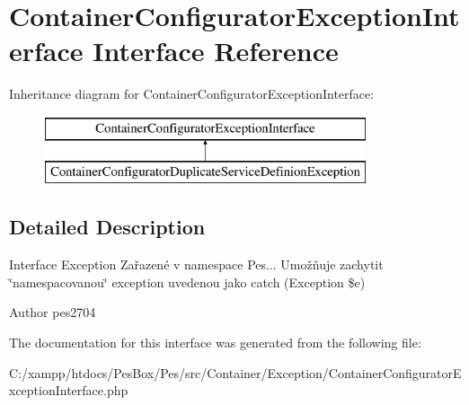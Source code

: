 \hypertarget{interface_pes_1_1_container_1_1_exception_1_1_container_configurator_exception_interface}{}\section{Container\+Configurator\+Exception\+Interface Interface Reference}
\label{interface_pes_1_1_container_1_1_exception_1_1_container_configurator_exception_interface}
Inheritance diagram for Container\+Configurator\+Exception\+Interface\+:\begin{figure}[H]
\begin{center}
\leavevmode
\includegraphics[height=2.000000cm]{interface_pes_1_1_container_1_1_exception_1_1_container_configurator_exception_interface}
\end{center}
\end{figure}


\subsection{Detailed Description}
Interface Exception Zařazené v namespace Pes... Umožňuje zachytit \char`\"{}namespacovanou\char`\"{} exception uvedenou jako catch (Exception \$e)

\begin{DoxyAuthor}{Author}
pes2704 
\end{DoxyAuthor}


The documentation for this interface was generated from the following file\+:\begin{DoxyCompactItemize}
\item 
C\+:/xampp/htdocs/\+Pes\+Box/\+Pes/src/\+Container/\+Exception/Container\+Configurator\+Exception\+Interface.\+php\end{DoxyCompactItemize}
